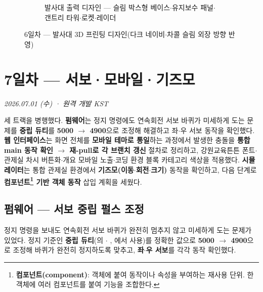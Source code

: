 \begin{figure}[htbp]\centering
  \begin{subfigure}{0.42\linewidth}\centering
    \caption{발사대 출력 디자인 — 슬림 박스형 베이스$\cdot$유지보수 패널$\cdot$갠트리 타워$\cdot$로켓$\cdot$레이더}
  \end{subfigure}
  \caption{6일차 — 발사대 3D 프린팅 디자인(다크 네이비$\cdot$차콜 슬림 외장 방향 반영)}
\end{figure}

\chapter{7일차 — 서보·모바일·기즈모}
\textit{2026.07.01 (수) · 원격 개발 KST}

\begin{summarybox}
세 트랙을 병행했다. \textbf{펌웨어}는 정지 명령에도 연속회전 서보 바퀴가 미세하게 도는
문제를 \textbf{중립 듀티}를 \textbf{5000 $\to$ 4900}으로 조정해 해결하고 좌$\cdot$우 서보
동작을 확인했다. \textbf{웹 인터페이스}는 화면 전체를 \textbf{모바일 테마로 통일}하는 과정에서
발생한  충돌을 \textbf{통합 main 동작 확인 $\to$ 재-pull로 각 브랜치 갱신} 절차로
정리하고, 강원교육튼튼 폰트$\cdot$관제실 차시 버튼화$\cdot$개요 모바일 노출$\cdot$코딩 환경
블록 카테고리 색상을 적용했다. \textbf{시뮬레이터}는 통합 관제실 환경에서
\textbf{기즈모(이동$\cdot$회전$\cdot$크기)} 동작을 확인하고, 다음 단계로 \textbf{컴포넌트\footnote{\textbf{컴포넌트(component)}: 객체에 붙여 동작이나 속성을 부여하는 재사용 단위. 한 객체에 여러 컴포넌트를 붙여 기능을 조합한다.} 기반
객체 동작} 삽입 계획을 세웠다.
\end{summarybox}

\section{펌웨어 — 서보 중립 펄스 조정}
정지 명령을 보내도 연속회전 서보 바퀴가 완전히 멈추지 않고 미세하게 도는 문제가 있었다.
정지 기준인 \textbf{중립 듀티}(의 $\cdot$%
, 에서 사용)를 정확한 값으로 \textbf{5000 $\to$ 4900}으로
조정해 바퀴가 완전히 정지하도록 맞추고, \textbf{좌$\cdot$우 서보}를 각각 동작 확인했다.

